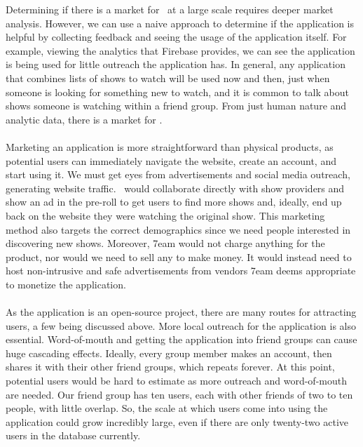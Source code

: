 \documentclass{article}
\begin{document}

\noindent Determining if there is a market for \progname ~at a large scale requires deeper market analysis. However, we can use a naive approach to determine if the application is helpful by collecting feedback and seeing the usage of the application itself. For example, viewing the analytics that Firebase provides, we can see the application is being used for little outreach the application has. In general, any application that combines lists of shows to watch will be used now and then, just when someone is looking for something new to watch, and it is common to talk about shows someone is watching within a friend group. From just human nature and analytic data, there is a market for \progname .
\\~\\ Marketing an application is more straightforward than physical products, as potential users can immediately navigate the website, create an account, and start using it. We must get eyes from advertisements and social media outreach, generating website traffic. \progname ~would collaborate directly with show providers and show an ad in the pre-roll to get users to find more shows and, ideally, end up back on the website they were watching the original show. This marketing method also targets the correct demographics since we need people interested in discovering new shows. Moreover, 7eam would not charge anything for the product, nor would we need to sell any to make money. It would instead need to host non-intrusive and safe advertisements from vendors 7eam deems appropriate to monetize the application.
\\~\\ As the application is an open-source project, there are many routes for attracting users, a few being discussed above. More local outreach for the application is also essential. Word-of-mouth and getting the application into friend groups can cause huge cascading effects. Ideally, every group member makes an account, then shares it with their other friend groups, which repeats forever. At this point, potential users would be hard to estimate as more outreach and word-of-mouth are needed. Our friend group has ten users, each with other friends of two to ten people, with little overlap. So, the scale at which users come into using the application could grow incredibly large, even if there are only twenty-two active users in the database currently.
\end{document}
